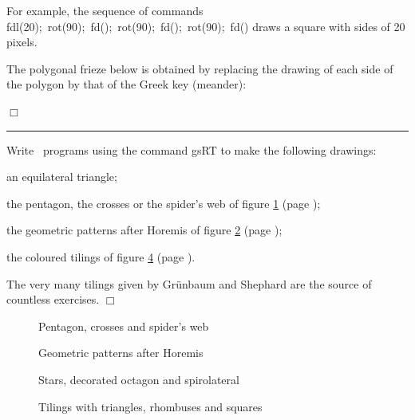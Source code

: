  For example, the sequence of commands {\idt fdl(20);\ rot(90);\ fd();\
rot(90);\ fd();\ rot(90);\ fd()} draws a square with sides of
20 pixels.
\begin{exemple}[Polygonal Greek key]{\rm
The polygonal frieze below is obtained by replacing the drawing
of each side of the polygon by that of the Greek key (meander):

\vspace{\baselineskip}


\noindent $\Box$ }\end{exemple}
\noindent \rule{137mm}{0.1mm}\par\nopagebreak %
\begin{exercices}{Write \python\ programs using the command {\idt gsRT}
to make the following drawings:

\tiret an equilateral triangle;

\tiret the pentagon, the crosses or the spider's web of figure \ref{fig:PtCrCrTa} (page \pageref{fig:PtCrCrTa});

\tiret the geometric patterns after Horemis \cite{horemis} of figure \ref{fig:horemis} (page \pageref{fig:horemis});

\tiret the coloured tilings of figure \ref{fig:pavtrilo} (page \pageref{fig:pavtrilo}).

The very many tilings given by Grünbaum and Shephard \cite{grunbaum} are the source
of countless exercises.
\noindent $\Box$}\end{exercices}
\begin{figure}[htbp]
 \caption{Pentagon, crosses and spider's web}\label{fig:PtCrCrTa}
\end{figure}
\begin{figure}[htbp]
 \caption{Geometric patterns after Horemis}\label{fig:horemis}
\end{figure}
\begin{figure}[htbp]
 \caption{Stars, decorated octagon and spirolateral}\label{fig:etocsp}
\end{figure}
\begin{figure}[htbp]
 \caption{Tilings with triangles, rhombuses and squares}\label{fig:pavtrilo}
\end{figure}
